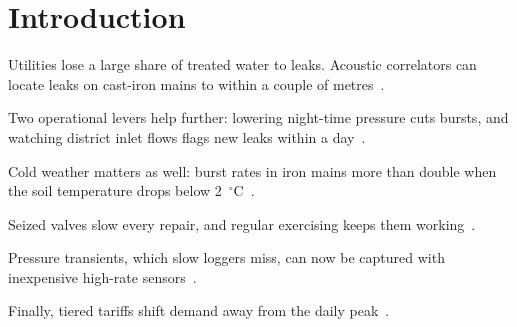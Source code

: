 
\section{Introduction}

Utilities lose a large share of treated water to leaks. Acoustic correlators
can locate leaks on cast-iron mains to within a couple of metres~\cite{alder2021leakage}.

Two operational levers help further: lowering night-time pressure cuts bursts,
and watching district inlet flows flags new leaks within a day~\cite{birch2019pressure,cedar2020smartmeters}.

Cold weather matters as well: burst rates in iron mains more than double when
the soil temperature drops below 2~$^\circ$C~\cite{dogwood2018chlorine}.

Seized valves slow every repair, and regular exercising keeps them
working~\cite{fir2017valves}.

Pressure transients, which slow loggers miss, can now be captured with
inexpensive high-rate sensors~\cite{hazel2019sensors}.

Finally, tiered tariffs shift demand away from the daily peak~\cite{ivy2021tariffs}.
